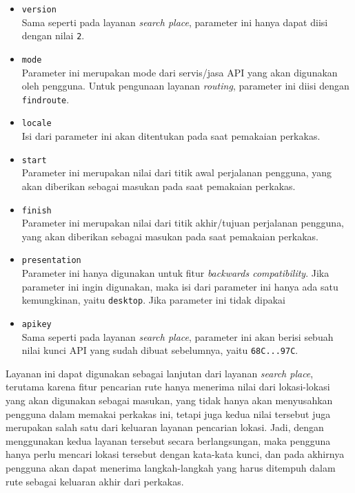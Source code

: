\begin{itemize}
	\item \verb|version|\\
	Sama seperti pada layanan \textit{search place}, parameter ini hanya dapat diisi dengan nilai \verb|2|.
	\item \verb|mode|\\
	Parameter ini merupakan mode dari servis/jasa API yang akan digunakan oleh pengguna. Untuk pengunaan layanan \textit{routing}, parameter ini diisi dengan \verb|findroute|.
	\item \verb|locale|\\
	Isi dari parameter ini akan ditentukan pada saat pemakaian perkakas.
	\item \verb|start|\\
	Parameter ini merupakan nilai \latlon dari titik awal perjalanan pengguna, yang akan diberikan sebagai masukan pada saat pemakaian perkakas.
	\item \verb|finish|\\
	Parameter ini merupakan nilai \latlon dari titik akhir/tujuan perjalanan pengguna, yang akan diberikan sebagai masukan pada saat pemakaian perkakas.
	\item \verb|presentation|\\
	Parameter ini hanya digunakan untuk fitur \textit{backwards compatibility}. Jika parameter ini ingin digunakan, maka isi dari parameter ini hanya ada satu kemungkinan, yaitu \verb|desktop|. Jika parameter ini tidak dipakai
	\item \verb|apikey|\\
	Sama seperti pada layanan \textit{search place}, parameter ini akan berisi sebuah nilai kunci API yang sudah dibuat sebelumnya, yaitu \verb|68C...97C|.
\end{itemize}
\vspace{\baselineskip}\noindent
Layanan ini dapat digunakan sebagai lanjutan dari layanan \textit{search place}, terutama karena fitur pencarian rute hanya menerima nilai \latlon dari lokasi-lokasi yang akan digunakan sebagai masukan, yang tidak hanya akan menyusahkan pengguna dalam memakai perkakas \cl ini, tetapi juga kedua nilai tersebut juga merupakan salah satu dari keluaran layanan pencarian lokasi. Jadi, dengan menggunakan kedua layanan tersebut secara berlangsungan, maka pengguna hanya perlu mencari lokasi tersebut dengan kata-kata kunci, dan pada akhirnya pengguna akan dapat menerima langkah-langkah yang harus ditempuh dalam rute sebagai keluaran akhir dari perkakas.

